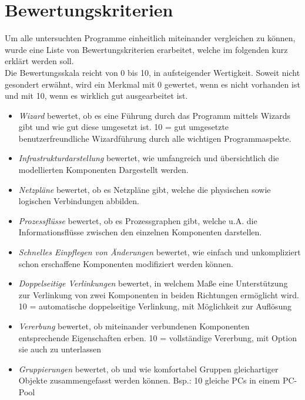 \section{Bewertungskriterien}
Um alle untersuchten Programme einheitlich miteinander vergleichen zu können, wurde eine Liste von Bewertungskriterien erarbeitet, welche im folgenden kurz erklärt werden soll.\\
Die Bewertungsskala reicht von 0 bis 10, in aufsteigender Wertigkeit. Soweit nicht gesondert erwähnt, wird ein Merkmal mit 0 gewertet, wenn es nicht vorhanden ist und mit 10, wenn es wirklich gut ausgearbeitet ist.
\begin{itemize}
	\item \textit{Wizard} bewertet, ob es eine Führung durch das Programm mittels Wizards gibt und wie gut diese umgesetzt ist. 10 = gut umgesetzte benutzerfreundliche Wizardführung durch alle wichtigen Programmaspekte.

	\item \textit{Infrastrukturdarstellung} bewertet, wie umfangreich und übersichtlich die modellierten Komponenten Dargestellt werden.

	\item \textit{Netzpläne} bewertet, ob es Netzpläne gibt, welche die physischen sowie logischen Verbindungen abbilden.

	\item \textit{Prozessflüsse} bewertet, ob es Prozessgraphen gibt, welche u.A. die Informationsflüsse zwischen den einzelnen Komponenten darstellen.
	\item \textit{Schnelles Einpflegen von Änderungen} bewertet, wie einfach und unkompliziert schon erschaffene Komponenten modifiziert werden können.

	\item \textit{Doppelseitige Verlinkungen} bewertet, in welchem Maße eine Unterstützung zur Verlinkung von zwei Komponenten in beiden Richtungen ermöglicht wird. 10 = automatische doppelseitige Verlinkung, mit Möglichkeit zur Auflösung

	\item \textit{Vererbung}  bewertet, ob miteinander verbundenen Komponenten entsprechende Eigenschaften erben. 10 = vollständige Vererbung, mit Option sie auch zu unterlassen

	\item \textit{Gruppierungen} bewertet, ob und wie komfortabel Gruppen gleichartiger Objekte zusammengefasst werden können. Bsp.: 10 gleiche PCs in einem PC-Pool


\end{itemize}
